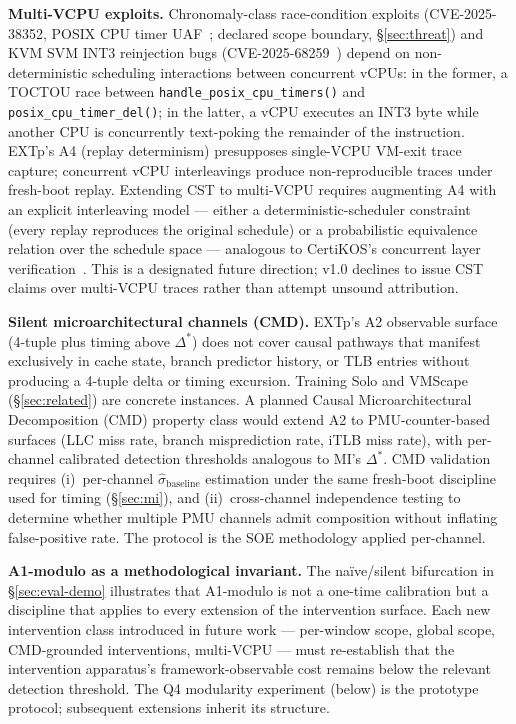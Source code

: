 \documentclass[conference]{IEEEtran}
\newcommand{\sigbase}{\hat{\sigma}_\text{baseline}}
\newcommand{\Dstar}{\Delta^{*}}
\begin{document}
\textbf{Multi-VCPU exploits.} Chronomaly-class race-condition
exploits (CVE-2025-38352, POSIX CPU timer
UAF~\cite{linuxkernel2025chronomaly}; declared scope boundary,
\S\ref{sec:threat}) and KVM SVM INT3 reinjection bugs
(CVE-2025-68259~\cite{linuxkernel2025int3reinject}) depend on
non-deterministic scheduling interactions between concurrent vCPUs:
in the former, a TOCTOU race between
\texttt{handle\_posix\_cpu\_timers()} and
\texttt{posix\_cpu\_timer\_del()}; in the latter, a vCPU executes
an INT3 byte while another CPU is concurrently text-poking the
remainder of the instruction. EXTp's A4 (replay determinism)
presupposes single-VCPU VM-exit trace capture; concurrent vCPU
interleavings produce non-reproducible traces under fresh-boot
replay. Extending CST to multi-VCPU requires augmenting A4 with an
explicit interleaving model --- either a deterministic-scheduler
constraint (every replay reproduces the original schedule) or a
probabilistic equivalence relation over the schedule space ---
analogous to CertiKOS's concurrent layer
verification~\cite{gu2016certikos}. This is a designated future
direction; v1.0 declines to issue CST claims over multi-VCPU
traces rather than attempt unsound attribution.

\textbf{Silent microarchitectural channels (CMD).} EXTp's A2
observable surface (4-tuple plus timing above $\Dstar$) does not
cover causal pathways that manifest exclusively in cache state,
branch predictor history, or TLB entries without producing a
4-tuple delta or timing excursion. Training Solo and VMScape
(\S\ref{sec:related}) are concrete instances. A planned
Causal Microarchitectural Decomposition (CMD) property class
would extend A2 to PMU-counter-based surfaces (LLC miss rate, branch
misprediction rate, iTLB miss rate), with per-channel calibrated
detection thresholds analogous to MI's $\Dstar$. CMD validation
requires (i)~per-channel $\sigbase$ estimation under the same
fresh-boot discipline used for timing (\S\ref{sec:mi}), and
(ii)~cross-channel independence testing to determine whether
multiple PMU channels admit composition without inflating
false-positive rate. The protocol is the SOE methodology applied
per-channel.

\textbf{A1-modulo as a methodological invariant.} The
naïve/silent bifurcation in \S\ref{sec:eval-demo} illustrates that
A1-modulo is not a one-time calibration but a discipline that
applies to every extension of the intervention surface. Each new
intervention class introduced in future work --- per-window scope,
global scope, CMD-grounded interventions, multi-VCPU --- must
re-establish that the intervention apparatus's framework-observable
cost remains below the relevant detection threshold. The Q4
modularity experiment (below) is the prototype protocol; subsequent
extensions inherit its structure.
\end{document}
